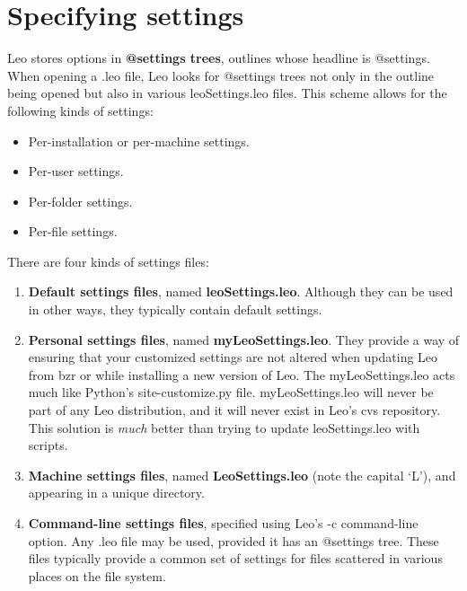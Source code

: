 \documentclass[a4paper,10pt,english]{sphinxmanual}
\begin{document}
\section{Specifying settings}
\label{customizing:id1}\label{customizing:specifying-settings}
Leo stores options in \textbf{@settings trees}, outlines whose headline is
@settings. When opening a .leo file, Leo looks for @settings trees not only
in the outline being opened but also in various leoSettings.leo files.
This scheme allows for the following kinds of settings:
\begin{itemize}
\item {} 
Per-installation or per-machine settings.

\item {} 
Per-user settings.

\item {} 
Per-folder settings.

\item {} 
Per-file settings.

\end{itemize}

There are four kinds of settings files:
\begin{enumerate}
\item {} 
\textbf{Default settings files}, named \textbf{leoSettings.leo}.
Although they can be used in other ways, they typically contain default settings.

\item {} 
\textbf{Personal settings files}, named \textbf{myLeoSettings.leo}. They provide a way
of ensuring that your customized settings are not altered when updating Leo
from bzr or while installing a new version of Leo. The myLeoSettings.leo acts
much like Python's site-customize.py file. myLeoSettings.leo will never be
part of any Leo distribution, and it will never exist in Leo's cvs
repository. This solution is \emph{much} better than trying to update
leoSettings.leo with scripts.

\item {} 
\textbf{Machine settings files}, named \textbf{LeoSettings.leo} (note the capital `L'),
and appearing in a unique directory.

\item {} 
\textbf{Command-line settings files}, specified using Leo's -c command-line
option. Any .leo file may be used, provided it has an @settings tree. These
files typically provide a common set of settings for files scattered in
various places on the file system.

\end{enumerate}
\end{document}
